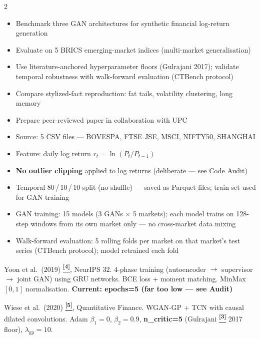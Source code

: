 \documentclass[10pt]{article}
\newcommand{\navybox}[2]{\begin{tcolorbox}[mybox={Navy}{LBg},title={#1}]#2\end{tcolorbox}}
\newcommand{\skybox}[2]{\begin{tcolorbox}[mybox={Sky}{BBg},title={#1}]#2\end{tcolorbox}}
\newcommand{\tcite}[1]{%
  \hyperlink{R:#1}{\textsuperscript{\scriptsize\textbf{[#1]}}}}
\begin{document}
\begin{multicols}{2}

\navybox{Research Goal}{%
\begin{itemize}
  \item Benchmark three GAN architectures for synthetic financial log-return generation
  \item Evaluate on 5 BRICS emerging-market indices (multi-market generalisation)
  \item Use literature-anchored hyperparameter floors (Gulrajani 2017); validate temporal robustness with walk-forward evaluation (CTBench protocol)
  \item Compare stylized-fact reproduction: fat tails, volatility clustering, long memory
  \item Prepare peer-reviewed paper in collaboration with UPC
\end{itemize}}

\skybox{Data Pipeline}{%
\begin{itemize}
  \item Source: 5 CSV files --- BOVESPA, FTSE JSE, MSCI, NIFTY50, SHANGHAI
  \item Feature: daily log return $r_t = \ln(P_t / P_{t-1})$
  \item \textbf{No outlier clipping} applied to log returns (deliberate --- see Code Audit)
  \item Temporal 80\,/\,10\,/\,10 split (no shuffle) --- saved as Parquet files; train set used for GAN training
  \item GAN training: 15 models (3 GANs $\times$ 5 markets); each model trains on 128-step windows from its own market only --- no cross-market data mixing
  \item Walk-forward evaluation: 5 rolling folds per market on that market's test series (CTBench protocol); model retrained each fold
\end{itemize}}

\columnbreak

\begin{tcolorbox}[mybox={TGcol}{ABg},title={TimeGAN}]
Yoon et al.\ (2019)\tcite{4}, NeurIPS 32. 4-phase training (autoencoder $\to$ supervisor $\to$ joint GAN) using GRU networks. BCE loss + moment matching. MinMax $[0,1]$ normalisation.
\textcolor{DRed}{\bfseries\small Current: epochs=5 (far too low --- see Audit)}
\end{tcolorbox}

\begin{tcolorbox}[mybox={QGcol}{BBg},title={QuantGAN}]
Wiese et al.\ (2020)\tcite{5}, Quantitative Finance. WGAN-GP + TCN with causal dilated convolutions. Adam $\beta_1=0$, $\beta_2=0.9$, \textbf{n\_critic=5} (Gulrajani\tcite{3} 2017 floor), $\lambda_\text{gp}=10$.
\end{tcolorbox}


\end{multicols}
\end{document}
